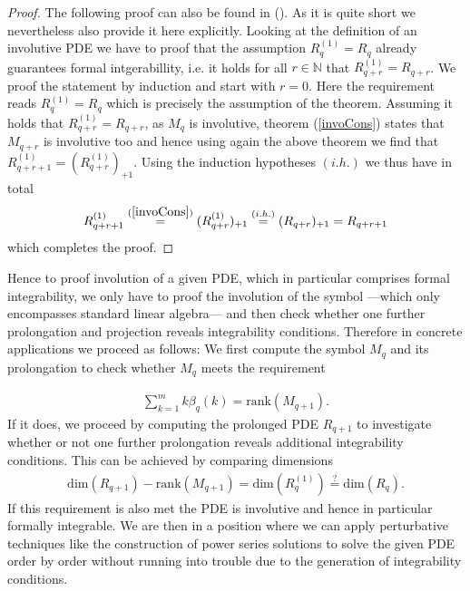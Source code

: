 \documentclass[a4paper,12pt, DIV=14, BCOR=5mm, twoside, headsepline, numbers=noenddot]{scrbook}
\begin{document}
\begin{proof}
The following proof can also be found in (\cite{seiler1994analysis}). As it is quite short we nevertheless also provide it here explicitly.
Looking at the definition of an involutive PDE we have to proof that the assumption $R_q^{(1)} = R_q$ already guarantees formal intgerabillity, i.e. it holds for all $r \in \mathbb{N}$ that $R_{q+r}^(1) = R_{q+r}$. We proof the statement by induction and start with $r=0$. Here the requirement reads $R_q^{(1)}=R_q$ which is precisely the assumption of the theorem. Assuming it holds that $R_{q+r}^{(1)}=R_{q+r}$, as $M_q$ is involutive, theorem (\ref{invoCons}) states that $M_{q+r}$ is involutive too and hence using again the above theorem we find that $R_{q+r+1}^{(1)}= (R_{q+r}^{(1)})_{+1}$. Using the induction hypotheses $(i.h.)$ we thus have in total
\begin{align}
   R_{q+r+1}^{(1)} \overset{(\ref{invoCons})}{=} (R_{q+r}^{(1)})_{+1} \overset{(i.h.)}{=} (R_{q+r})_{+1} = R_{q+r+1} 
\end{align}
which completes the proof. 
\end{proof}
Hence to proof involution of a given PDE, which in  particular comprises formal integrability, we only have to proof the involution of the symbol ---which only encompasses standard linear algebra--- and then check whether one further prolongation and projection reveals integrability conditions. Therefore in concrete applications we proceed as follows: We first compute the symbol $M_q$ and its prolongation to check whether $M_q$ meets the requirement 

\begin{align}
        \sum_{k=1}^m k\beta_q(k) = \mathrm{rank}(M_{q+1}).
\end{align}
If it does, we proceed by computing the prolonged PDE $R_{q+1}$ to investigate whether or not one further prolongation reveals additional integrability conditions. This can be achieved by comparing dimensions
\begin{align}
    \mathrm{dim}(R_{q+1}) - \mathrm{rank}(M_{q+1}) = \mathrm{dim}(R_q^{(1)}) \stackrel{?}{=} \mathrm{dim}(R_q).
\end{align}
If this requirement is also met the PDE is involutive and hence in particular formally integrable. We are then in a position where we can apply perturbative techniques like the construction of power series solutions to solve the given PDE order by order without running into trouble due to the generation of integrability conditions.
\end{document}

